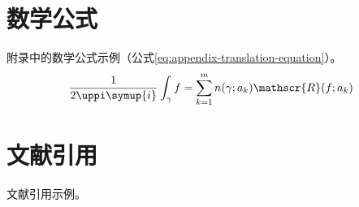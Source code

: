 \begin{translation}
\section{数学公式}

附录中的数学公式示例（公式\eqref{eq:appendix-translation-equation}）。
\begin{equation}
  \frac{1}{2 \uppi \symup{i}} \int_\gamma f = \sum_{k=1}^m n(\gamma; a_k) \mathscr{R}(f; a_k)
  \label{eq:appendix-translation-equation}
\end{equation}


\section{文献引用}

文献引用示例\cite{abrahams99tex}。





\begin{translation-index}
  \nocite{salomon1995advanced}
  
  
\end{translation-index}

\end{translation}
